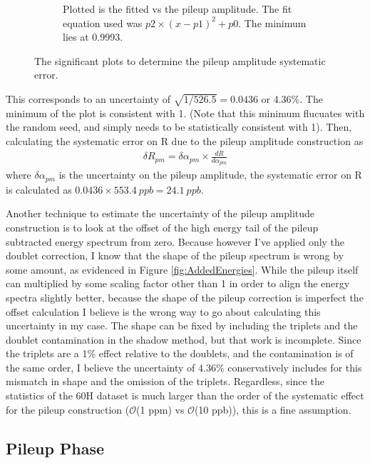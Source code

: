 \begin{figure}[h]
\begin{subfigure}[t]{0.45\textwidth}
			    \caption{Plotted is the fitted \chisq vs the pileup amplitude. The fit equation used was $p2 \times (x - p1)^{2} + p0.$ The minimum lies at 0.9993.}
		    \end{subfigure}
		\caption[PileupMultiplier]{The significant plots to determine the pileup amplitude systematic error.}
		\label{fig:PileupMultiplier}
		\end{figure}

		This corresponds to an uncertainty of $\sqrt{1/526.5} = 0.0436$ or 4.36\%. The minimum of the \chisq plot is consistent with 1. (Note that this minimum flucuates with the random seed, and simply needs to be statistically consistent with 1). Then, calculating the systematic error on R due to the pileup amplitude construction as 
			\begin{align}
				\delta R_{pm} = \delta\alpha_{pm} \times \frac{dR}{d\alpha_{pm}}
			\end{align}
		where $\delta\alpha_{pm}$ is the uncertainty on the pileup amplitude, the systematic error on R is calculated as $0.0436 \times \SI{553.4}{ppb} = \SI{24.1}{ppb}$.

		Another technique to estimate the uncertainty of the pileup amplitude construction is to look at the offset of the high energy tail of the pileup subtracted energy spectrum from zero. Because however I've applied only the doublet correction, I know that the shape of the pileup spectrum is wrong by some amount, as evidenced in Figure \ref{fig:AddedEnergies}. While the pileup itself can multiplied by some scaling factor other than 1 in order to align the energy spectra slightly better, because the shape of the pileup correction is imperfect the offset calculation I believe is the wrong way to go about calculating this uncertainty in my case. The shape can be fixed by including the triplets and the doublet contamination in the shadow method, but that work is incomplete. Since the triplets are a 1\% effect relative to the doublets, and the contamination is of the same order, I believe the uncertainty of 4.36\% conservatively includes for this mismatch in shape and the omission of the triplets. Regardless, since the statistics of the 60H dataset is much larger than the order of the systematic effect for the pileup construction ($\mathcal{O}$(1 ppm) vs $\mathcal{O}$(10 ppb)), this is a fine assumption.

	\subsection{Pileup Phase}
	\label{SubSec:PileupPhase}


